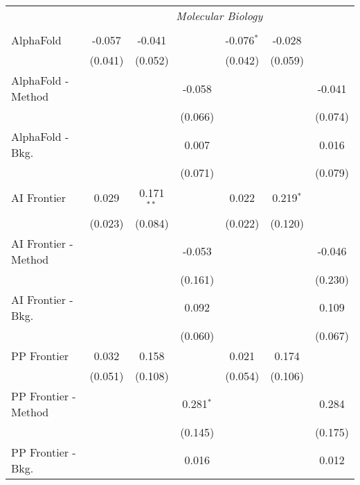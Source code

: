 \begin{tabular}{lcccccc}
 & \multicolumn{6}{c}{\textit{Molecular Biology}} \\ \\
   AlphaFold            & -0.057  & -0.041        &             & -0.076$^{*}$ & -0.028         &   \\   
                        & (0.041) & (0.052)       &             & (0.042)      & (0.059)        &   \\   
   AlphaFold - Method   &         &               & -0.058      &              &                & -0.041\\   
                        &         &               & (0.066)     &              &                & (0.074)\\   
   AlphaFold - Bkg.     &         &               & 0.007       &              &                & 0.016\\   
                        &         &               & (0.071)     &              &                & (0.079)\\   
   AI Frontier          & 0.029   & 0.171$^{**}$  &             & 0.022        & 0.219$^{*}$    &   \\   
                        & (0.023) & (0.084)       &             & (0.022)      & (0.120)        &   \\   
   AI Frontier - Method &         &               & -0.053      &              &                & -0.046\\   
                        &         &               & (0.161)     &              &                & (0.230)\\   
   AI Frontier - Bkg.   &         &               & 0.092       &              &                & 0.109\\   
                        &         &               & (0.060)     &              &                & (0.067)\\   
   PP Frontier          & 0.032   & 0.158         &             & 0.021        & 0.174          &   \\   
                        & (0.051) & (0.108)       &             & (0.054)      & (0.106)        &   \\   
   PP Frontier - Method &         &               & 0.281$^{*}$ &              &                & 0.284\\   
                        &         &               & (0.145)     &              &                & (0.175)\\   
   PP Frontier - Bkg.   &         &               & 0.016       &              &                & 0.012\\   

\end{tabular}
